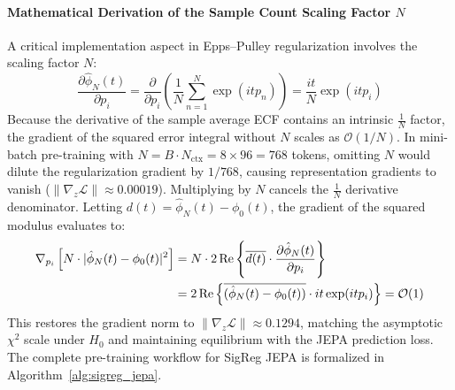 \documentclass{article}
\begin{document}
\paragraph{Mathematical Derivation of the Sample Count Scaling Factor $N$}
A critical implementation aspect in Epps--Pulley regularization involves the scaling factor $N$:
\begin{equation}
    \frac{\partial \hat{\phi}_N(t)}{\partial p_i} = \frac{\partial}{\partial p_i} \left( \frac{1}{N} \sum_{n=1}^N \exp(i t p_n) \right) = \frac{i t}{N} \exp(i t p_i)
\end{equation}
Because the derivative of the sample average ECF contains an intrinsic $\frac{1}{N}$ factor, the gradient of the squared error integral without $N$ scales as $\mathcal{O}(1/N)$. In mini-batch pre-training with $N = B \cdot N_{\text{ctx}} = 8 \times 96 = 768$ tokens, omitting $N$ would dilute the regularization gradient by $1/768$, causing representation gradients to vanish ($\|\nabla_z \mathcal{L}\| \approx 0.00019$). Multiplying by $N$ cancels the $\frac{1}{N}$ derivative denominator. Letting $d(t) = \hat{\phi}_N(t) - \phi_0(t)$, the gradient of the squared modulus evaluates to:
\begin{align}
    \nabla_{p_i} \left[ N \cdot |\hat{\phi}_N(t) - \phi_0(t)|^2 \right] &= N \cdot 2 \operatorname{Re}\left\{ \overline{d(t)} \cdot \frac{\partial \hat{\phi}_N(t)}{\partial p_i} \right\} \notag \\
    &= 2 \operatorname{Re}\left\{ \overline{(\hat{\phi}_N(t) - \phi_0(t))} \cdot i t \exp(i t p_i) \right\} = \mathcal{O}(1)
\end{align}
This restores the gradient norm to $\|\nabla_z \mathcal{L}\| \approx 0.1294$, matching the asymptotic $\chi^2$ scale under $H_0$ and maintaining equilibrium with the JEPA prediction loss. The complete pre-training workflow for SigReg JEPA is formalized in Algorithm~\ref{alg:sigreg_jepa}.
\end{document}

